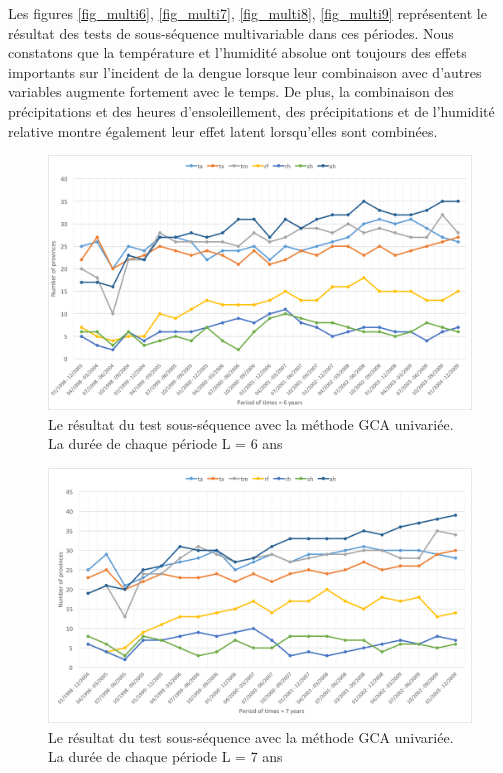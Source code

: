 Les figures \ref{fig_multi6}, \ref{fig_multi7}, \ref{fig_multi8}, \ref{fig_multi9} représentent le résultat des tests de sous-séquence multivariable dans ces périodes. Nous constatons que la température et l’humidité absolue ont toujours des effets importants sur l’incident de la dengue lorsque leur combinaison avec d’autres variables augmente fortement avec le temps. De plus, la combinaison des précipitations et des heures d'ensoleillement, des précipitations et de l'humidité relative montre également leur effet latent lorsqu'elles sont combinées.

\begin{figure}[h]
\begin{center}
\includegraphics[width = \linewidth]{../figures/chap5/uni_6.png}
\caption{Le résultat du test sous-séquence avec la méthode GCA univariée. La durée de chaque période L = 6 ans }
\label{fig_uni6}	
\end{center}
\end{figure}


\begin{figure}[h]
\begin{center}
\includegraphics[width = \linewidth]{../figures/chap5/uni_7.png}
\caption{Le résultat du test sous-séquence avec la méthode GCA univariée. La durée de chaque période L = 7 ans }
\label{fig_uni7}	
\end{center}
\end{figure}

